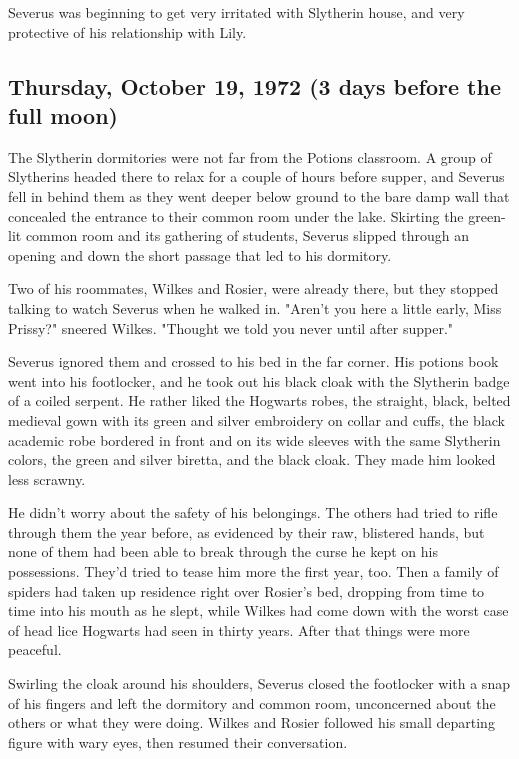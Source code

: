 \documentclass[a4paper,11pt]{article}
\begin{document}
Severus was beginning to get very irritated with Slytherin house, and very protective of his relationship with Lily.

\subsection{Thursday, October 19, 1972 (3 days before the full moon)}

The Slytherin dormitories were not far from the Potions classroom. A group of Slytherins headed there to relax for a couple of hours before supper, and Severus fell in behind them as they went deeper below ground to the bare damp wall that concealed the entrance to their common room under the lake. Skirting the green-lit common room and its gathering of students, Severus slipped through an opening and down the short passage that led to his dormitory.

Two of his roommates, Wilkes and Rosier, were already there, but they stopped talking to watch Severus when he walked in. "Aren't you here a little early, Miss Prissy?" sneered Wilkes. "Thought we told you never until after supper."

Severus ignored them and crossed to his bed in the far corner. His potions book went into his footlocker, and he took out his black cloak with the Slytherin badge of a coiled serpent. He rather liked the Hogwarts robes, the straight, black, belted medieval gown with its green and silver embroidery on collar and cuffs, the black academic robe bordered in front and on its wide sleeves with the same Slytherin colors, the green and silver biretta, and the black cloak. They made him looked less scrawny.

He didn't worry about the safety of his belongings. The others had tried to rifle through them the year before, as evidenced by their raw, blistered hands, but none of them had been able to break through the curse he kept on his possessions. They'd tried to tease him more the first year, too. Then a family of spiders had taken up residence right over Rosier's bed, dropping from time to time into his mouth as he slept, while Wilkes had come down with the worst case of head lice Hogwarts had seen in thirty years. After that things were more peaceful.

Swirling the cloak around his shoulders, Severus closed the footlocker with a snap of his fingers and left the dormitory and common room, unconcerned about the others or what they were doing. Wilkes and Rosier followed his small departing figure with wary eyes, then resumed their conversation.
\end{document}
